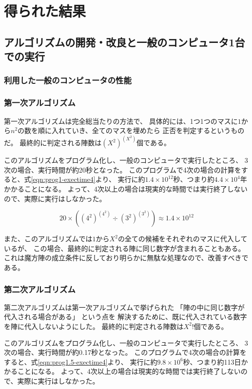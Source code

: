 \section{得られた結果}
\subsection{アルゴリズムの開発・改良と一般のコンピュータ1台での実行}
\subsubsection{利用した一般のコンピュータの性能}
\subsubsection{第一次アルゴリズム}
第一次アルゴリズムは完全総当たりの方法で、
具体的には、1つ1つのマスに$1$から$n^2$の数を順に入れていき、全てのマスを埋めたら
正否を判定するというものだ。
最終的に判定される陣数は$(X^2)^{(X^2)}$個である。

このアルゴリズムをプログラム化し、一般のコンピュータで実行したところ、
3次の場合、実行時間が約20秒となった。
このプログラムで4次の場合の計算をすると、式\ref{eqn:prog1-exectime4}より、
実行に約$1.4 \times 10^{12}$秒、つまり約$4.4 \times 10^4$年かかることになる。
よって、4次以上の場合は現実的な時間では実行終了しないので、実際に実行はしなかった。

\begin{equation} \label{eqn:prog1-exectime4}
20 \times ((4^2)^{(4^2)} \div (3^2)^{(3^2)}) \approx 1.4 \times 10^{12}
\end{equation}

また、このアルゴリズムでは$1$から$X^2$の全ての候補をそれぞれのマスに代入しているが、
この場合、最終的に判定される陣に同じ数字が含まれることもある。
これは魔方陣の成立条件に反しており明らかに無駄な処理なので、改善すべきである。


\subsubsection{第二次アルゴリズム}
第二次アルゴリズムは第一次アルゴリズムで挙げられた
「陣の中に同じ数字が代入される場合がある」
という点を
解決するために、既に代入されている数字を陣に代入しないようにした。
最終的に判定される陣数は$X^2!$個である。

このアルゴリズムをプログラム化し、一般のコンピュータで実行したところ、
3次の場合、実行時間が約0.17秒となった。
このプログラムで4次の場合の計算をすると、式\ref{eqn:prog1.5-exectime4}より、
実行に約$9.8 \times 10^6$秒、つまり約113日かかることになる。
よって、4次以上の場合は現実的な時間では実行終了しないので、実際に実行はしなかった。

